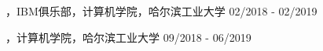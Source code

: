 
\begin{cventries}

\cvsocial
{，IBM俱乐部，计算机学院，哈尔滨工业大学}
{02/2018 - 02/2019}

\cvsocial
{，计算机学院，哈尔滨工业大学}
{09/2018 - 06/2019}

\end{cventries}